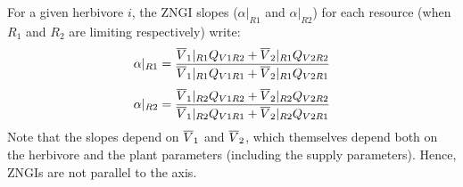 \documentclass[12pt]{article}
\newcommand\barre[1]{\overline{\rule{0pt}{1.5ex}#1}}
\begin{document}
For a given herbivore $i$, the ZNGI slopes ($\alpha|_{R1}$ and $\alpha|_{R2}$) for each resource (when $R_1$ and $R_2$ are limiting respectively) write:
\begin{equation}\label{alpha}
\alpha|_{R1}=\frac{\barre{V}_1|_{R1}Q_{V1R2}+\barre{V}_2|_{R1}Q_{V2R2}}{\barre{V}_1|_{R1}Q_{V1R1}+\barre{V}_2|_{R1}Q_{V2R1}}
\end{equation}
\begin{equation}\label{alpha}
\alpha|_{R2}=\frac{\barre{V}_1|_{R2}Q_{V1R2}+\barre{V}_2|_{R2}Q_{V2R2}}{\barre{V}_1|_{R2}Q_{V1R1}+\barre{V}_2|_{R2}Q_{V2R1}}
\end{equation}
Note that the slopes depend on $\barre{V}_1$ and $\barre{V}_2$, which themselves depend both on the herbivore and the plant parameters (including the supply parameters). Hence, ZNGIs are not parallel to the axis. \par
\end{document}
